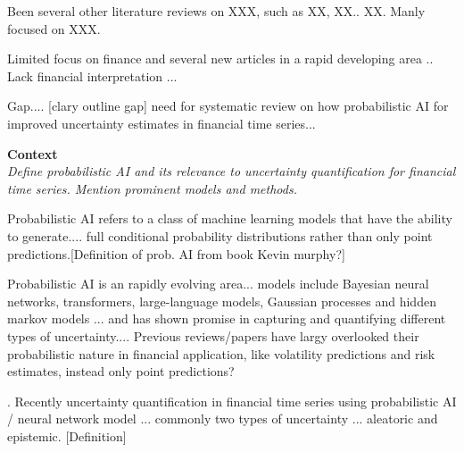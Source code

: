 Been several other literature reviews on XXX, such as XX, XX.. XX. Manly focused on XXX. 

Limited focus on finance and several new articles in a rapid developing area .. Lack financial interpretation ... 

Gap.... [clary outline gap] need for systematic review on how probabilistic AI for improved uncertainty estimates in financial time series... 

\textbf{Context}\\
\textit{Define probabilistic AI and its relevance to uncertainty quantification for financial time series. Mention prominent models and methods.}

Probabilistic AI refers to a class of machine learning models that have the ability to generate.... full conditional probability distributions rather than only point predictions.[Definition of prob. AI from book Kevin murphy?]

Probabilistic AI is an rapidly evolving area... models include Bayesian neural networks, transformers, large-language models, Gaussian processes and hidden markov models ... and has shown promise in capturing and quantifying different types of uncertainty.... Previous reviews/papers have largy overlooked their probabilistic nature in financial application, like volatility predictions and risk estimates, instead only point predictions?

.
Recently uncertainty quantification in financial time series using probabilistic AI / neural network model ... commonly two types of uncertainty ... aleatoric and epistemic.  [Definition]  


